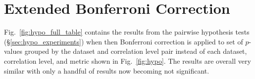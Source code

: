 \section{Extended Bonferroni Correction}
\label{sec:bonferroni_full}
Fig.~\ref{fig:hypo_full_table} contains the results from the pairwise hypothesis tests (\S\ref{sec:hypo_experiments}) when then Bonferroni correction is applied to set of $p$-values grouped by the dataset and correlation level pair instead of each dataset, correlation level, and metric shown in Fig.~\ref{fig:hypo}.
The results are overall very similar with only a handful of results now becoming not significant.

